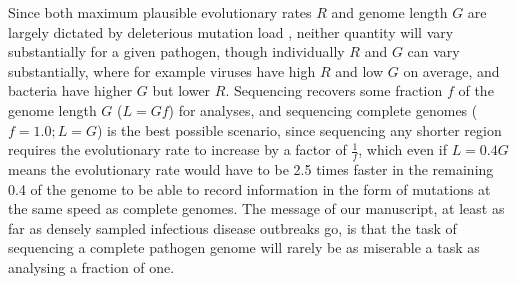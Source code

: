 \documentclass[11pt,oneside,letterpaper]{article}
\begin{document}
Since both maximum plausible evolutionary rates $R$ and genome length $G$ are largely dictated by deleterious mutation load \citep{gago_extremely_2009}, neither quantity will vary substantially for a given pathogen, though individually $R$ and $G$ can vary substantially, where for example viruses have high $R$ and low $G$ on average, and bacteria have higher $G$ but lower $R$.
Sequencing recovers some fraction $f$ of the genome length $G$ ($L=Gf$) for analyses, and sequencing complete genomes ($f=1.0; L = G$) is the best possible scenario, since sequencing any shorter region requires the evolutionary rate to increase by a factor of $\frac{1}{f}$, which even if $L = 0.4 G$ means the evolutionary rate would have to be 2.5 times faster in the remaining 0.4 of the genome to be able to record information in the form of mutations at the same speed as complete genomes.
The message of our manuscript, at least as far as densely sampled infectious disease outbreaks go, is that the task of sequencing a complete pathogen genome will rarely be as miserable a task as analysing a fraction of one.

\end{document}
